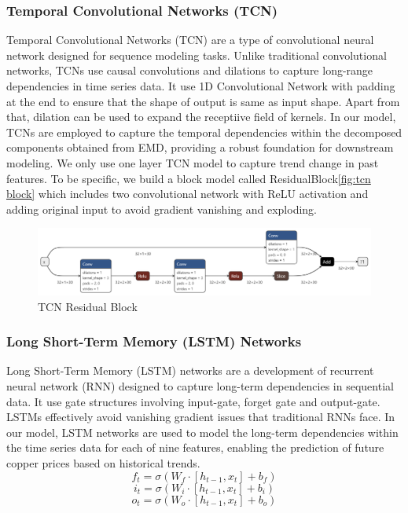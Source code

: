 \documentclass[final-report]{report-template}
\begin{document}
\subsubsection{\textbf{Temporal Convolutional Networks (TCN)}}
Temporal Convolutional Networks (TCN) are a type of convolutional neural network designed for sequence modeling tasks. Unlike traditional convolutional networks, TCNs use causal convolutions and dilations to capture long-range dependencies in time series data.  It use 1D Convolutional Network with padding at the end to ensure that the shape of output is same as input shape.  Apart from that,  dilation can be used to expand the receptiive field of kernels.  In our model, TCNs are employed to capture the temporal dependencies within the decomposed components obtained from EMD, providing a robust foundation for downstream modeling.  We only use one layer TCN model to capture trend change in past features.  To be specific, we build a block model called ResidualBlock\autoref{fig:tcn block} which includes two convolutional network with ReLU activation and adding original input to avoid gradient vanishing and exploding. \cite{lea2016temporalconvolutionalnetworksunified}
\begin{figure}[h]
    \centering
    \includegraphics[width=1\linewidth]{figures/simple_residualblock.onnx.png}
    \caption{TCN Residual Block}
    \label{fig:tcn block}
\end{figure}
\subsubsection{\textbf{Long Short-Term Memory (LSTM) Networks}}
Long Short-Term Memory (LSTM) networks are a development of recurrent neural network (RNN) \cite{rumelhart1986learning} designed to capture long-term dependencies in sequential data. It use gate structures involving input-gate, forget gate and output-gate.  LSTMs effectively avoid  vanishing gradient issues that traditional RNNs face. In our model, LSTM networks are used to model the long-term dependencies within the time series data for each of nine features, enabling the prediction of future copper prices based on historical trends. 
\begin{equation}
f_t = \sigma(W_f \cdot [h_{t-1}, x_t] + b_f)
\end{equation}
\begin{equation}
i_t = \sigma(W_i \cdot [h_{t-1}, x_t] + b_i)
\end{equation}
\begin{equation}
o_t = \sigma(W_o \cdot [h_{t-1}, x_t] + b_o)
\end{equation}
\end{document}

